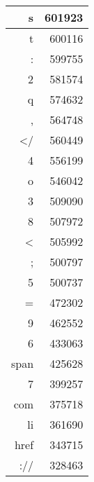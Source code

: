 \documentclass[12pt]{article} %
\begin{document}
\begin{table}[h]
\begin{tabular}{|r|r|}
s	&	601923	\\	\hline
t	&	600116	\\	\hline
:	&	599755	\\	\hline
2	&	581574	\\	\hline
q	&	574632	\\	\hline
,	&	564748	\\	\hline
</	&	560449	\\	\hline
4	&	556199	\\	\hline
o	&	546042	\\	\hline
3	&	509090	\\	\hline
8	&	507972	\\	\hline
<	&	505992	\\	\hline
;	&	500797	\\	\hline
5	&	500737	\\	\hline
=	&	472302	\\	\hline
9	&	462552	\\	\hline
6	&	433063	\\	\hline
span	&	425628	\\	\hline
7	&	399257	\\	\hline
com	&	375718	\\	\hline
li	&	361690	\\	\hline
href	&	343715	\\	\hline
://	&	328463	\\	\hline
\end{tabular}
\end{table}
\end{document}
